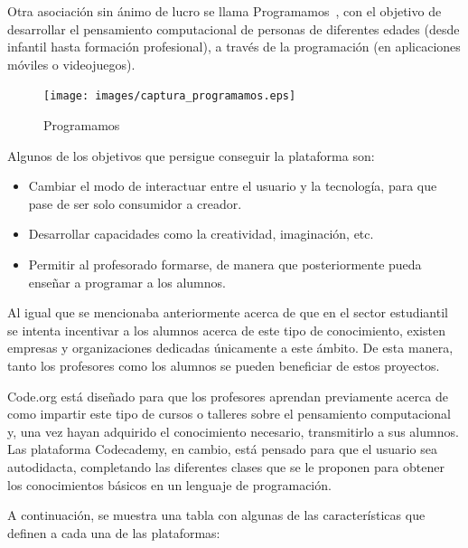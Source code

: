 Otra asociación sin ánimo de lucro se llama Programamos~\cite{Programamos}, con el objetivo de desarrollar el pensamiento computacional de personas de diferentes edades (desde infantil hasta formación profesional), a través de la programación (en aplicaciones móviles o videojuegos).

\begin{figure}[!th]
\begin{center}
\texttt{[image: images/captura\_programamos.eps]}
\caption{Programamos}
\label{fig:3}
\end{center}
\end{figure}

Algunos de los objetivos que persigue conseguir la plataforma son:

\begin{itemize}
    \item Cambiar el modo de interactuar entre el usuario y la tecnología, para que pase de ser solo consumidor a creador.
    \item Desarrollar capacidades como la creatividad, imaginación, etc.
    \item Permitir al profesorado formarse, de manera que posteriormente pueda enseñar a programar a los alumnos.
\end{itemize}

Al igual que se mencionaba anteriormente acerca de que en el sector estudiantil se intenta incentivar a los alumnos acerca de este tipo de conocimiento, existen empresas y organizaciones dedicadas únicamente a este ámbito. De esta manera, tanto los profesores como los alumnos
se pueden beneficiar de estos proyectos.

Code.org está diseñado para que los profesores aprendan previamente acerca de como impartir este tipo de cursos o talleres sobre el pensamiento computacional y, una vez hayan adquirido el conocimiento necesario, transmitirlo a sus alumnos. Las plataforma Codecademy, en cambio, 
está pensado para que el usuario sea autodidacta, completando las diferentes clases que se le proponen para obtener los conocimientos básicos en un lenguaje de programación. 

A continuación, se muestra una tabla con algunas de las características que definen a cada una de las plataformas:

